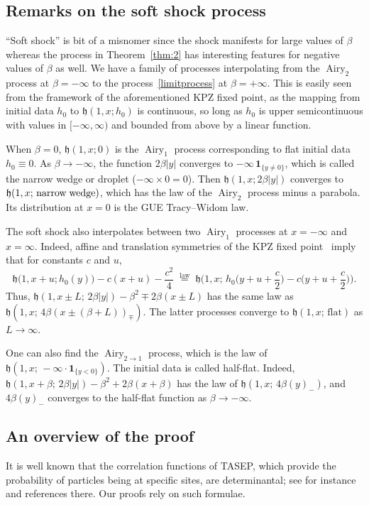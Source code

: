 \documentclass[AHL,Unicode,longabstracts]{cedram}
\DeclareMathOperator{\airy}{Airy}
\newcommand{\ind}[1]{\mathbf{1}_{\{ #1 \}}}
\newcommand{\h}{\mathfrak{h}}
\begin{document}
\subsection{Remarks on the soft shock process} \label{sec:shockremarks}
``Soft shock'' is bit of a misnomer since the shock manifests for large values of $\beta$ whereas the process in Theorem~\ref{thm:2} has interesting features for negative values of $\beta$ as well. We have a family of processes interpolating from the $\airy_2$ process at $\beta = -\infty$ to the process~\eqref{limitprocess} at $\beta = + \infty$. This is easily seen from the framework of the aforementioned KPZ fixed point, as the mapping from initial data $h_0$ to $\h(1,x; h_0)$ is continuous, so long as $h_0$ is upper semicontinuous with values in $[-\infty, \infty)$ and bounded from above by a linear function.

When $\beta = 0$, $\h(1,x; 0)$ is the $\airy_1$ process corresponding to flat initial data $h_0 \equiv 0$. As $\beta \to - \infty$, the function $2\beta|y|$ converges to $- \infty \, \ind{y \neq 0}$, which is called the narrow wedge or droplet ($-\infty \times 0 = 0$). Then $\h(1,x; 2\beta |y|)$ converges to $\h(1,x; \, \text{narrow\;wedge})$, which has the law of the $\airy_2$ process minus a parabola. Its distribution at $x = 0$ is the GUE Tracy--Widom law.

The soft shock also interpolates between two $\airy_1$ processes at $x = -\infty$ and $x = \infty$. Indeed, affine and translation symmetries of the KPZ fixed point~\cite[Theorem~4.5]{MQR} imply that for constants $c$ and $u$,
\[
\h \big(1,x+u; h_0(y) \big) -c(x+u)-\frac{c^2}{4} \;\overset{\text{law}}{=}\;
\h \bigg(1,x; \, h_0 \Big (y+u+\frac{c}{2} \Big) - c \Big (y+u+\frac{c}{2} \Big) \bigg).
\]
Thus, $\h(1,x \pm L; \, 2\beta|y|) - \beta^2 \mp 2\beta(x \pm L)$ has the same law as $\h (1,x; \,4 \beta (x \pm (\beta+L))_{\mp})$. The latter processes converge to $\h(1,x;\, \text{flat})$ as $L \to \infty$.

One can also find the $\airy_{2 \to 1}$ process, which is the law of $\h (1,x; \, - \infty \cdot \ind{y < 0})$. The initial data is called half-flat. Indeed, $\h (1,x+\beta; \, 2\beta|y|) - \beta^2 + 2\beta(x+\beta)$ has the law of $\h (1,x; \, 4\beta (y)_{-})$, and $4\beta (y)_{-}$ converges to the half-flat function as $\beta \to - \infty$.

\subsection{An overview of the proof} \label{sec:overview}
It is well known that the correlation functions of TASEP, which provide the probability of particles being at specific sites, are determinantal; see for instance~\cite{BFPS, BG} and references there. Our proofs rely on such formulae.
\end{document}
